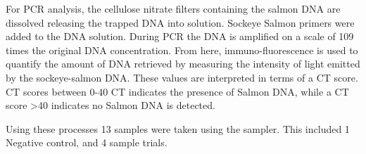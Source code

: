 \documentclass[11pt, letterpaper]{article}
\begin{document}
\newline\par
For PCR analysis, the cellulose nitrate filters containing the salmon DNA are dissolved releasing the trapped DNA into solution. Sockeye Salmon primers were added to the DNA solution. During PCR the DNA is amplified on a scale of 109 times the original DNA concentration.  From here, immuno-fluorescence is used to quantify the amount of DNA retrieved by measuring the intensity of light emitted by the sockeye-salmon DNA. These values are interpreted in terms of a CT score. CT scores between 0-40 CT indicates the presence of Salmon DNA, while a CT score >40 indicates no Salmon DNA is detected.
\newline\par
Using these processes 13 samples were taken using the sampler. This included 1 Negative control, and 4 sample trials.
\end{document}

